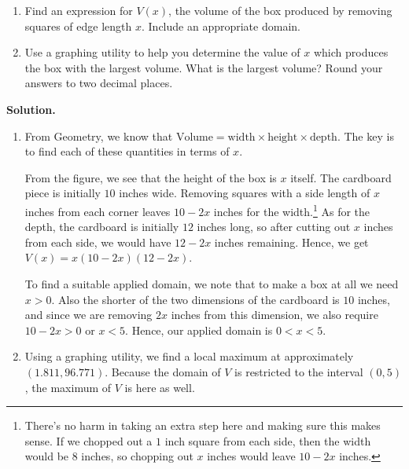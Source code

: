 \documentclass{ximera}
\begin{document}
\begin{ex}
\begin{enumerate}

\item  Find an expression for $V(x)$, the volume of the box produced by removing squares of edge length $x$. Include an appropriate domain.

\item  Use a graphing utility to help you determine the value of $x$ which produces the box with the largest volume.  What is the largest volume?  Round your answers to two decimal places.

\end{enumerate}

{\bf Solution.} 

\begin{enumerate}

\item  From Geometry, we know that $\text{Volume} = \text{width} \times \text{height} \times \text{depth}$.  The key is to find each of these quantities in terms of $x$.  

\medskip

From the figure, we see that the height of the box is $x$ itself.  The cardboard piece is initially $10$ inches wide.  Removing squares with a side length of $x$ inches from each corner leaves $10-2x$ inches for the width.\footnote{There's no harm in taking an extra step here and making sure this makes sense.  If we chopped out a $1$ inch square from each side, then the width would be $8$ inches, so chopping out $x$ inches would leave $10-2x$ inches.}   As for the depth, the cardboard is initially $12$ inches long, so after cutting out $x$ inches from each side, we would have $12-2x$ inches remaining. Hence, we get $V(x) = x(10-2x)(12-2x)$.  

\medskip

To find a suitable applied domain, we note that to make a box at all we need $x > 0$.  Also the shorter of the two dimensions of the cardboard is $10$ inches, and since we are removing $2x$ inches from this dimension, we also require $10 - 2x > 0$ or $x < 5$.  Hence, our applied domain is $0 < x < 5$.

\item  Using a graphing utility, we find a local maximum at approximately $(1.811, 96.771)$.  Because the domain of $V$ is restricted to the interval $(0,5)$,  the maximum of $V$ is here as well.

\begin{center}


\end{center}
\end{enumerate}
\end{ex}
\end{document}
